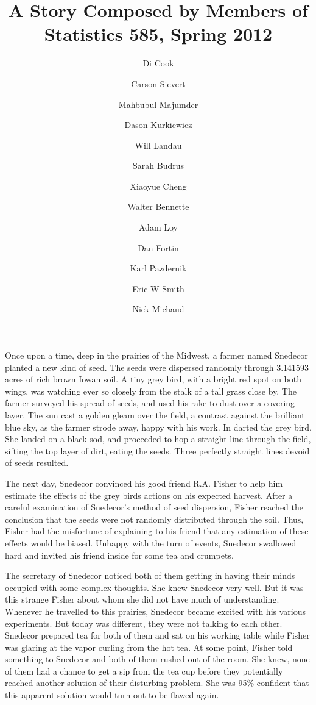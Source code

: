 \documentclass{article}
\begin{document}
\title{A Story Composed by Members of Statistics 585, Spring 2012}

\author{Di Cook \and Carson Sievert \and Mahbubul Majumder \and Dason Kurkiewicz \and Will Landau \and Sarah Budrus \and Xiaoyue Cheng \and Walter Bennette \and Adam Loy \and Dan Fortin \and Karl Pazdernik \and Eric W Smith \and Nick Michaud}

\maketitle

Once upon a time, deep in the prairies of the Midwest, a farmer named Snedecor planted a new kind of seed. The seeds were dispersed randomly through 3.141593 acres of rich brown Iowan soil. A tiny grey bird, with a bright red spot on both wings, was watching ever so closely from the stalk of a tall grass close by. The farmer surveyed his spread of seeds, and used his rake to dust over a covering layer. The sun cast a golden gleam over the field, a contrast against the brilliant blue sky, as the farmer strode away, happy with his work. In darted the grey bird. She landed on a black sod, and proceeded to hop a straight line through the field, sifting the top layer of dirt, eating the seeds. Three perfectly straight lines devoid of seeds resulted. 

The next day, Snedecor convinced his good friend R.A. Fisher to help him estimate the effects of the grey birds actions on his expected harvest. After a careful examination of Snedecor's method of seed dispersion, Fisher reached the conclusion that the seeds were not randomly distributed through the soil. Thus, Fisher had the misfortune of explaining to his friend that any estimation of these effects would be biased. Unhappy with the turn of events, Snedecor swallowed hard and invited his friend inside for some tea and crumpets. 


The secretary of Snedecor noticed both of them getting in having their minds occupied with some complex thoughts. She knew Snedecor very well. But it was this strange Fisher about whom she did not have much of understanding. Whenever he travelled to this prairies, Snedecor became excited with his various experiments. But today was different, they were not talking to each other. Snedecor prepared tea for both of them and sat on his working table while Fisher was glaring at the vapor curling from the hot tea. At some point, Fisher told something to Snedecor and both of them rushed out of the room. She knew, none of them had a chance to get a sip from the tea cup before they potentially reached another solution of their disturbing problem. She was 95\% confident that this apparent solution would turn out to be flawed again. 
\end{document}
